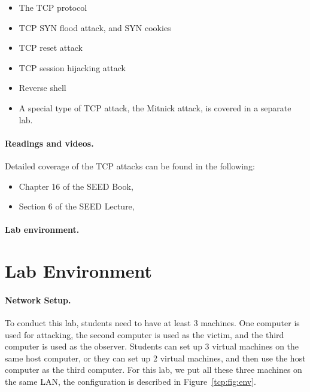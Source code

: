 \begin{itemize}[noitemsep]
\item The TCP protocol
\item TCP SYN flood attack, and SYN cookies 
\item TCP reset attack
\item TCP session hijacking attack
\item Reverse shell 
\item A special type of TCP attack, the Mitnick attack, is covered 
in a separate lab. 
\end{itemize}


\paragraph{Readings and videos.}
Detailed coverage of the TCP attacks can be found in the following:

\begin{itemize}
\item Chapter 16 of the SEED Book, \seedbook
\item Section 6 of the SEED Lecture, \seedisvideo
\end{itemize}


\paragraph{Lab environment.} \seedenvironment



\section{Lab Environment}



\paragraph{Network Setup.}
To conduct this lab, students need to have at least 3 machines. One computer
is used for attacking, the second computer is used as the victim, and 
the third computer is used as the observer.
Students can set up 3 virtual machines on the same host computer, or they can set up
2 virtual machines, and then use the host computer as the third computer.
For this lab, we put all these three machines on the same LAN,
the configuration is described in Figure~\ref{tcp:fig:env}.



